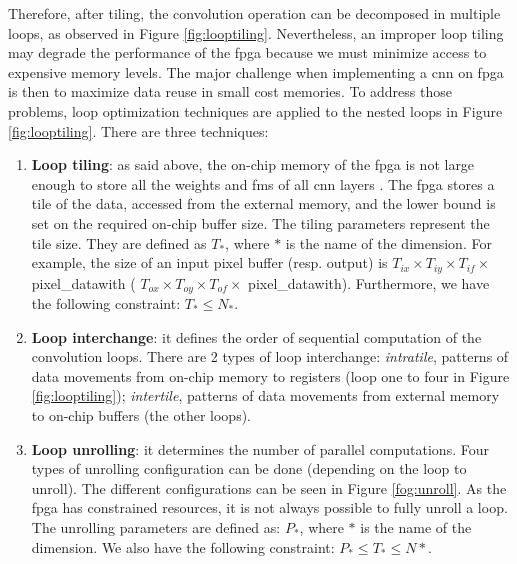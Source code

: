 Therefore, after tiling, the convolution operation can be decomposed in multiple loops, as observed in Figure \ref{fig:looptiling}. Nevertheless, an improper loop tiling may degrade the performance of the \acrshort{fpga} because we must minimize access to expensive memory levels. The major challenge when implementing a \acrshort{cnn} on \acrshort{fpga} is then to maximize data reuse in small cost memories. To address those problems, loop optimization techniques are applied to the nested loops in Figure \ref{fig:looptiling}. There are three techniques:
%
\begin{enumerate}
    \item \textbf{Loop tiling}: as said above, the on-chip memory of the \acrshort{fpga} is not large enough to store all the weights and \acrshort{fm}s of all \acrshort{cnn} layers \cite{abdelouahab_accelerating_2018}. The \acrshort{fpga} stores a tile of the data, accessed from the external memory, and the lower bound is set on the required on-chip buffer size. The tiling parameters represent the tile size. They are defined as $T_{*}$, where $*$ is the name of the dimension. For example, the size of an input pixel buffer (resp. output) is $T_{ix} \times T_{iy} \times T_{if} \times $ pixel\_datawith ( $ T_{ox} \times T_{oy} \times T_{of} \times $ pixel\_datawith). Furthermore, we have the following constraint: $T_{*} \leq N_{*}$.
    \item \textbf{Loop interchange}: it defines the order of sequential computation of the convolution loops. There are 2 types of loop interchange: \textit{intratile}, patterns of data movements from on-chip memory to registers (loop one to four in Figure \ref{fig:looptiling}); \textit{intertile}, patterns of data movements from external memory to on-chip buffers (the other loops).
    \item \textbf{Loop unrolling}: it determines the number of parallel computations. Four types of unrolling configuration can be done (depending on the loop to unroll). The different configurations can be seen in Figure \ref{fog:unroll}. As the \acrshort{fpga} has constrained resources, it is not always possible to fully unroll a loop. The unrolling parameters are defined as: $P_{*}$, where $*$ is the name of the dimension. We also have the following constraint: $P_{*} \leq T_{*} \leq N{*}$.
\end{enumerate}
%
